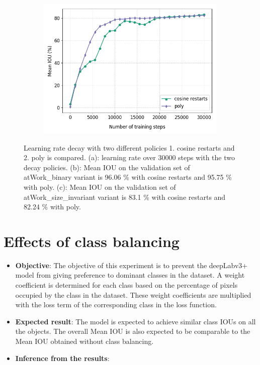 \begin{figure}
\begin{subfigure}{.3\textwidth}
			\includegraphics[width=1\linewidth]{images/lr_size}
			\caption{}
		\end{subfigure}
		\caption{Learning rate decay with two different policies 1. cosine restarts and 2. poly is compared. (a): learning rate over 30000 steps with the two decay policies. (b): Mean IOU on the validation set of atWork\_binary variant is 96.06 \% with cosine restarts and 95.75 \% with poly. (c): Mean IOU on the validation set of atWork\_size\_invariant variant is 83.1 \% with cosine restarts and 82.24 \% with poly.}
		\label{Fig:lr}
	\end{figure}

\section{Effects of class balancing}

	\begin{itemize}
		\item \textbf{Objective}: The objective of this experiment is to prevent the deepLabv3+ model from giving preference to dominant classes in the dataset. A weight coefficient is determined for each class based on the percentage of pixels occupied by the class in the dataset. These weight coefficients are multiplied with the loss term of the corresponding class in the loss function.
		\item \textbf{Expected result}: The model is expected to achieve similar class IOUs on all the objects. The overall Mean IOU is also expected to be comparable to the Mean IOU obtained without class balancing.
		\item \textbf{Inference from the results}: 
	\end{itemize}

